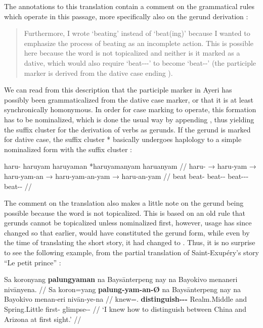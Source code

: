 The annotations to this translation contain a comment on the grammatical 
rules which operate in this passage, more specifically also on the gerund 
derivation :

\blockcquote[14--15]{becker:kafka:imperial}{Furthermore, I wrote 
 `beating' instead of  `beat(ing)' because I wanted to 
emphasize the process of beating as an incomplete action. This is possible here 
because the word is not topicalized and neither is it marked as a dative, which 
would also require  `beat-\Ptcp{}-\Nmlz{}-\Dat{}' to become 
 `beat-\Nmlz{}-\Dat{}' (the participle marker  is 
derived from the dative case ending ).}

We can read from this description that the participle marker in Ayeri has 
possibly been grammaticalized from the dative case marker, or that it is at 
least synchronically homonymous. In order for case marking to operate, this 
formation has to be nominalized, which is done the usual way by appending 
, thus yielding the suffix cluster  for the 
derivation of verbs as gerunds. If the gerund is marked for dative case, the 
suffix cluster * basically undergoes haplology to 
a simple nominalized form with the suffix cluster :

\ex\begingl
	\gla haru- {} haruyam {} haruyaman {} *haruyamanyam {} haruanyam //
	\glb haru- → haru-yam → haru-yam-an → haru-yam-an-yam → 
		haru-an-yam //
	\glc beat {} beat-\Ptcp{} {} beat-\Ptcp{}-\Nmlz{} {} 
		beat-\Ptcp{}-\Nmlz{}-\Dat{} {} beat-\Nmlz{}-\Dat{} //
\endgl\xe

The comment on the translation also makes a little note on the gerund being 
possible because the word is not topicalized. This is based on an old rule that 
gerunds cannot be topicalized unless nominalized first, however, usage has 
since changed so that earlier,  would have constituted 
the gerund form, while even by the time of translating the short story, it had 
changed to . Thus, it is no surprise to see the 
following example, from the partial translation of Saint-Exupéry's story 
\enquote{Le petit prince} \citep[3, 13]{benung:petitprince}:

\ex\label{ex:exuperygerund}\begingl
	\gla Sa koronyang \textbf{palungyaman} na Baysānterpeng nay na Bayokivo 
		menaneri nivānyena. //
	\glb Sa koron=yang \textbf{palung-yam-an-Ø} na Baysānterpeng nay na 
		Bayokivo menan-eri nivān-ye-na //
	\glc \PatT{} knew=\Fsg{}.\Aarg{} 
		\textbf{distinguish-\Ptcp{}-\Nmlz{}-\Top{}} \Gen{} Realm.Middle 
		and \Gen{} Spring.Little first-\Ins{} glimpse-\Pl{}-\Gen{} //
	\glft `I knew how to distinguish between China and Arizona at first 
		sight.' //
\endgl\xe

